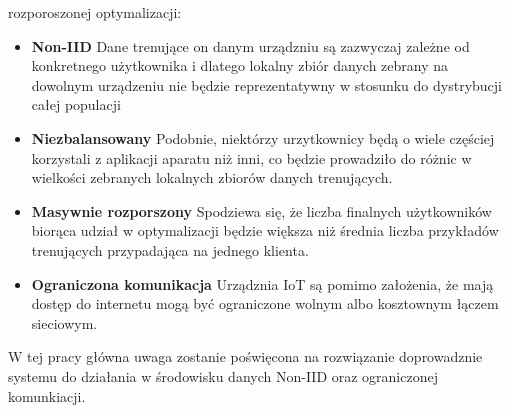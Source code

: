 \newpage




rozporoszonej optymalizacji:
\begin{itemize}

\item \textbf{Non-IID} Dane trenujące on danym urządzniu są zazwyczaj zależne od konkretnego użytkownika i dlatego lokalny zbiór danych zebrany na dowolnym urządzeniu nie będzie reprezentatywny w stosunku do dystrybucji całej populacji
\item \textbf{Niezbalansowany} Podobnie, niektórzy urzytkownicy będą o wiele częściej korzystali z aplikacji aparatu niż inni, co będzie prowadziło do różnic w wielkości zebranych lokalnych zbiorów  danych trenujących.
\item \textbf{Masywnie rozporszony} Spodziewa się, że liczba finalnych użytkowników biorąca udział w optymalizacji będzie większa niż średnia liczba przykładów trenujących przypadająca na jednego klienta.
\item \textbf{Ograniczona komunikacja} Urządznia IoT są pomimo założenia, że mają dostęp do
internetu mogą być ograniczone wolnym albo kosztownym łączem sieciowym.
\end{itemize}

W tej pracy główna uwaga zostanie poświęcona na rozwiązanie doprowadznie systemu do działania w środowisku danych Non-IID oraz ograniczonej komunkiacji.